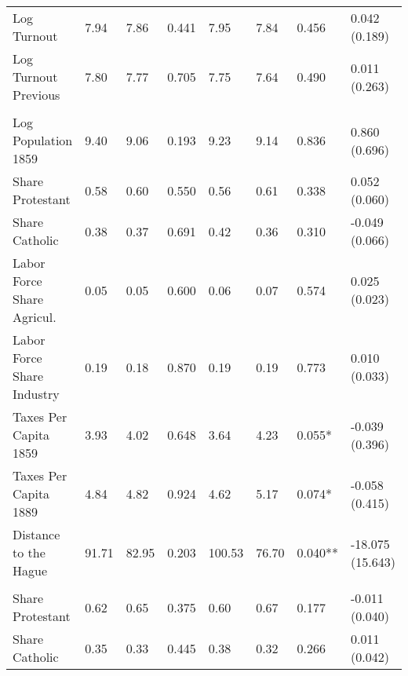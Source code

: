 \begin{table}[!h]
{\begin{threeparttable}
\begin{tabular}[t]{llllllll}
\hspace{1em}Log Turnout & \num{7.94} & \num{7.86} & 0.441 & \num{7.95} & \num{7.84} & 0.456 & 0.042 (0.189)\\
\hspace{1em}Log Turnout Previous & \num{7.80} & \num{7.77} & 0.705 & \num{7.75} & \num{7.64} & 0.490 & 0.011 (0.263)\\
\addlinespace[0.3em]
\multicolumn{8}{l}{\textbf{Panel D: Birthplace Characteristics}}\\
\hspace{1em}Log Population 1859 & \num{9.40} & \num{9.06} & 0.193 & \num{9.23} & \num{9.14} & 0.836 & 0.860 (0.696)\\
\hspace{1em}Share Protestant & \num{0.58} & \num{0.60} & 0.550 & \num{0.56} & \num{0.61} & 0.338 & 0.052 (0.060)\\
\hspace{1em}Share Catholic & \num{0.38} & \num{0.37} & 0.691 & \num{0.42} & \num{0.36} & 0.310 & -0.049 (0.066)\\
\hspace{1em}Labor Force Share Agricul. & \num{0.05} & \num{0.05} & 0.600 & \num{0.06} & \num{0.07} & 0.574 & 0.025 (0.023)\\
\hspace{1em}Labor Force Share Industry & \num{0.19} & \num{0.18} & 0.870 & \num{0.19} & \num{0.19} & 0.773 & 0.010 (0.033)\\
\hspace{1em}Taxes Per Capita 1859 & \num{3.93} & \num{4.02} & 0.648 & \num{3.64} & \num{4.23} & 0.055* & -0.039 (0.396)\\
\hspace{1em}Taxes Per Capita 1889 & \num{4.84} & \num{4.82} & 0.924 & \num{4.62} & \num{5.17} & 0.074* & -0.058 (0.415)\\
\hspace{1em}Distance to the Hague & \num{91.71} & \num{82.95} & 0.203 & \num{100.53} & \num{76.70} & 0.040** & -18.075 (15.643)\\
\addlinespace[0.3em]
\multicolumn{8}{l}{\textbf{Panel E: District Characteristics}}\\
\hspace{1em}Share Protestant & \num{0.62} & \num{0.65} & 0.375 & \num{0.60} & \num{0.67} & 0.177 & -0.011 (0.040)\\
\hspace{1em}Share Catholic & \num{0.35} & \num{0.33} & 0.445 & \num{0.38} & \num{0.32} & 0.266 & 0.011 (0.042)\\

\end{tabular}
\end{threeparttable}}
\end{table}
